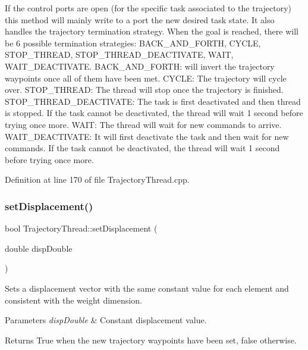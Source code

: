 If the control ports are open (for the specific task associated to the trajectory) this method will mainly write to a port the new desired task state. It also handles the trajectory termination strategy. When the goal is reached, there will be 6 possible termination strategies\+: B\+A\+C\+K\+\_\+\+A\+N\+D\+\_\+\+F\+O\+R\+TH, C\+Y\+C\+LE, S\+T\+O\+P\+\_\+\+T\+H\+R\+E\+AD, S\+T\+O\+P\+\_\+\+T\+H\+R\+E\+A\+D\+\_\+\+D\+E\+A\+C\+T\+I\+V\+A\+TE, W\+A\+IT, W\+A\+I\+T\+\_\+\+D\+E\+A\+C\+T\+I\+V\+A\+TE. B\+A\+C\+K\+\_\+\+A\+N\+D\+\_\+\+F\+O\+R\+TH\+: will invert the trajectory waypoints once all of them have been met. C\+Y\+C\+LE\+: The trajectory will cycle over. S\+T\+O\+P\+\_\+\+T\+H\+R\+E\+AD\+: The thread will stop once the trajectory is finished. S\+T\+O\+P\+\_\+\+T\+H\+R\+E\+A\+D\+\_\+\+D\+E\+A\+C\+T\+I\+V\+A\+TE\+: The task is first deactivated and then thread is stopped. If the task cannot be deactivated, the thread will wait 1 second before trying once more. W\+A\+IT\+: The thread will wait for new commands to arrive. W\+A\+I\+T\+\_\+\+D\+E\+A\+C\+T\+I\+V\+A\+TE\+: It will first deactivate the task and then wait for new commands. If the task cannot be deactivated, the thread will wait 1 second before trying once more. 

Definition at line 170 of file Trajectory\+Thread.\+cpp.

\hypertarget{classocra__recipes_1_1TrajectoryThread_a8cff41b23344e18cd795354ba893b3e2}{}\label{classocra__recipes_1_1TrajectoryThread_a8cff41b23344e18cd795354ba893b3e2} 
\subsubsection{\texorpdfstring{set\+Displacement()}{setDisplacement()}\hspace{0.1cm}{\footnotesize\ttfamily [1/2]}}
{\footnotesize\ttfamily bool Trajectory\+Thread\+::set\+Displacement (\begin{DoxyParamCaption}\item[{double}]{disp\+Double }\end{DoxyParamCaption})}

Sets a displacement vector with the same constant value for each element and consistent with the weight dimension.


\begin{DoxyParams}{Parameters}
{\em disp\+Double} & Constant displacement value.\\
\hline
\end{DoxyParams}
\begin{DoxyReturn}{Returns}
True when the new trajectory waypoints have been set, false otherwise. 
\end{DoxyReturn}



